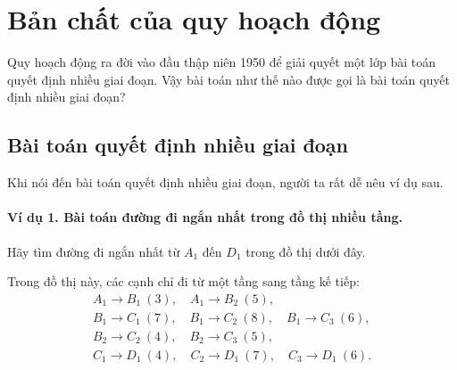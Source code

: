\documentclass[11pt]{article}
\begin{document}
\section{Bản chất của quy hoạch động}

Quy hoạch động ra đời vào đầu thập niên 1950 để giải quyết một lớp bài toán
quyết định nhiều giai đoạn. Vậy bài toán như thế nào được gọi là bài toán
quyết định nhiều giai đoạn?

\subsection{Bài toán quyết định nhiều giai đoạn}

Khi nói đến bài toán quyết định nhiều giai đoạn, người ta rất dễ nêu ví dụ
sau.

\paragraph{Ví dụ 1. Bài toán đường đi ngắn nhất trong đồ thị nhiều tầng.}
Hãy tìm đường đi ngắn nhất từ \(A_1\) đến \(D_1\) trong đồ thị dưới đây.

\begin{center}
\end{center}

Trong đồ thị này, các cạnh chỉ đi từ một tầng sang tầng kế tiếp:
\[
\begin{array}{c}
A_1\to B_1\ (3),\quad A_1\to B_2\ (5),\\
B_1\to C_1\ (7),\quad B_1\to C_2\ (8),\quad B_1\to C_3\ (6),\\
B_2\to C_2\ (4),\quad B_2\to C_3\ (5),\\
C_1\to D_1\ (4),\quad C_2\to D_1\ (7),\quad C_3\to D_1\ (6).
\end{array}
\]
\end{document}
